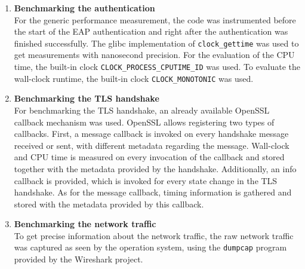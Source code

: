 \begin{enumerate}
    \item \textbf{Benchmarking the authentication}\\
    For the generic performance measurement, the code was instrumented before the start of the EAP authentication and right after the authentication was finished successfully. The glibc implementation of \texttt{clock\_gettime} was used to get measurements with nanosecond precision. For the evaluation of the CPU time, the built-in clock \texttt{CLOCK\_PROCESS\_CPUTIME\_ID} was used. To evaluate the wall-clock runtime, the built-in clock \texttt{CLOCK\_MONOTONIC} was used.
    \item \textbf{Benchmarking the TLS handshake}\\
    For benchmarking the TLS handshake, an already available OpenSSL callback mechanism was used. OpenSSL allows registering two types of callbacks. First, a message callback is invoked on every handshake message received or sent, with different metadata regarding the message. Wall-clock and CPU time is measured on every invocation of the callback and stored together with the metadata provided by the handshake. Additionally, an info callback is provided, which is invoked for every state change in the TLS handshake. As for the message callback, timing information is gathered and stored with the metadata provided by this callback.
    \item \textbf{Benchmarking the network traffic}\\
    To get precise information about the network traffic, the raw network traffic was captured as seen by the operation system, using the \texttt{dumpcap} program provided by the Wireshark project.   
\end{enumerate}

\endinput